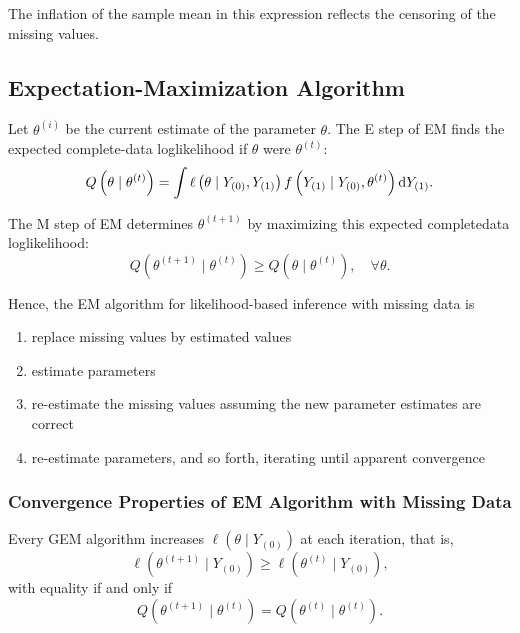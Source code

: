 \begin{example}
	The inflation of the sample mean in this expression reflects the censoring of the missing values.
\end{example}

\subsection{Expectation-Maximization Algorithm}

Let \(\theta^{(i)}\) be the current estimate of the parameter \(\theta\). The E step of EM finds the expected complete-data loglikelihood if \(\theta\) were \(\theta^{(t)}\):
\begin{equation}
	Q\left(\theta \mid \theta^{(t)}\right)=\int\ell\left(\theta \mid Y_{(0)}, Y_{(1)}\right) f\left(Y_{(1)} \mid Y_{(0)}, \theta^{(t)}\right) \mathop{}\!\mathrm{d} Y_{(1)}.
\end{equation}

The M step of EM determines \(\theta^{(t+1)}\) by maximizing this expected completedata loglikelihood:
\begin{equation}
	Q\left(\theta^{(t+1)} \mid \theta^{(t)}\right) \geq Q\left(\theta \mid \theta^{(t)}\right), \quad \forall\theta.
\end{equation}

Hence, the EM algorithm for likelihood-based inference with missing data is
\begin{enumerate}
	\item replace missing values by estimated
	      values
	\item estimate parameters
	\item re-estimate the missing values assuming the new parameter estimates are correct
	\item re-estimate parameters, and so forth, iterating until apparent convergence
\end{enumerate}

\subsubsection{Convergence Properties of EM Algorithm with Missing Data}

\begin{theorem}
	Every GEM algorithm increases \(\ell\left(\theta \mid Y_{(0)}\right)\) at each iteration, that is,
	\begin{equation}
		\ell\left(\theta^{(t+1)} \mid Y_{(0)}\right) \geq \ell\left(\theta^{(t)} \mid Y_{(0)}\right),
	\end{equation}
	with equality if and only if
	\begin{equation}
		Q\left(\theta^{(t+1)} \mid \theta^{(t)}\right)=Q\left(\theta^{(t)} \mid \theta^{(t)}\right).
	\end{equation}
\end{theorem}

